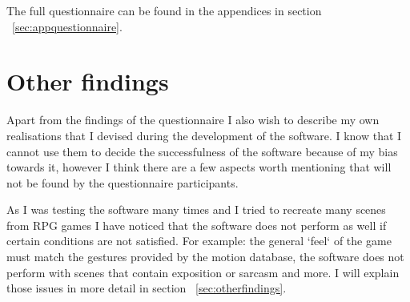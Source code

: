 The full questionnaire can be found in the appendices in section ~\ref{sec:appquestionnaire}.



\section{Other findings \label{sec:evalotherfindings}}
Apart from the findings of the questionnaire I also wish to describe my own realisations that I devised during the development of the software. I know that I cannot use them to decide the successfulness of the software because of my bias towards it, however I think there are a few aspects worth mentioning that will not be found by the questionnaire participants.

As I was testing the software many times and I tried to recreate many scenes from RPG games I have noticed that the software does not perform as well if certain conditions are not satisfied. For example: the general `feel` of the game must match the gestures provided by the motion database, the software does not perform with scenes that contain exposition or sarcasm and more. I will explain those issues in more detail in section ~\ref{sec:otherfindings}.




